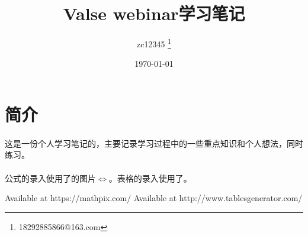\documentclass[UTF8]{ctexart}
\title{Valse webinar学习笔记}
\author{zc12345 \thanks{18292885866@163.com}}
\date\today
\begin{document}
\begin{titlepage}
\maketitle
\end{titlepage}

\tableofcontents


\section{简介}
\paragraph{}
这是一份个人学习笔记的，主要记录学习过程中的一些重点知识和个人想法，同时练习。
\paragraph{}
公式的录入使用了\cite{mathpix}的图片$\Leftrightarrow$。表格的录入使用了\cite{tablesgenerator}。

%


\begin{comment}
don't show in text
\end{comment}

\renewcommand\refname{参考文献}
\begin{thebibliography}{99}
     Available at https://mathpix.com/
      Available at http://www.tablesgenerator.com/
\end{thebibliography}

\end{document}
